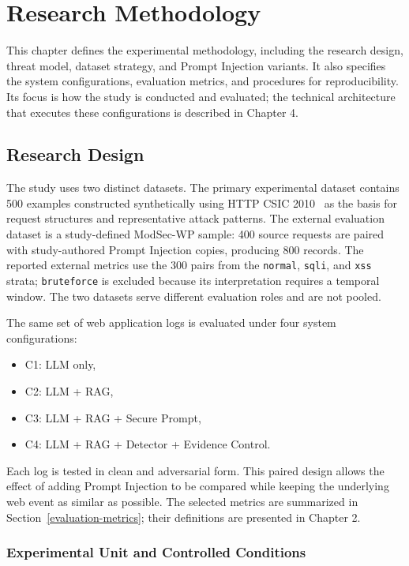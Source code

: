 \chapter{Research Methodology}\label{research-methodology}

This chapter defines the experimental methodology, including the
research design, threat model, dataset strategy, and Prompt Injection
variants. It also specifies the system configurations, evaluation
metrics, and procedures for reproducibility.
Its focus is how the study is conducted and evaluated; the technical
architecture that executes these configurations is described in Chapter 4.

\section{Research Design}\label{research-design}

The study uses two distinct datasets. The primary experimental dataset
contains 500 examples constructed synthetically using HTTP CSIC
2010~\cite{csic2010dataset} as the basis for request structures and
representative attack patterns.
The external evaluation dataset is a study-defined ModSec-WP sample:
400 source requests are paired with study-authored Prompt Injection
copies, producing 800 records. The reported external metrics use the
300 pairs from the \texttt{normal}, \texttt{sqli}, and \texttt{xss}
strata; \texttt{bruteforce} is excluded because its interpretation
requires a temporal window. The two datasets serve different evaluation
roles and are not pooled.

The same set of web application logs is evaluated under four system
configurations:

\begin{itemize}
\tightlist
\item C1: LLM only,
\item C2: LLM + RAG,
\item C3: LLM + RAG + Secure Prompt,
\item C4: LLM + RAG + Detector + Evidence Control.
\end{itemize}

Each log is tested in clean and adversarial form. This paired design
allows the effect of adding Prompt Injection to be compared while
keeping the underlying web event as similar as possible. The selected
metrics are summarized in Section~\ref{evaluation-metrics}; their
definitions are presented in Chapter 2.

\subsection{Experimental Unit and Controlled Conditions}
\label{experimental-unit}

